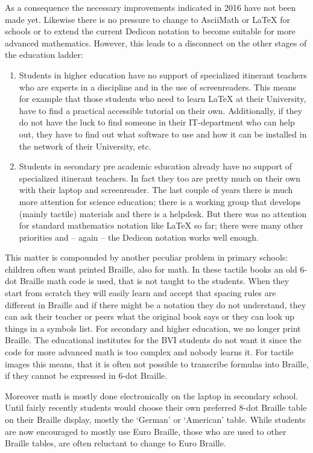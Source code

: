 \documentclass{easychair}
\begin{document}
As a consequence the necessary improvements indicated in 2016 have not been made
yet. Likewise there is no pressure to change to AsciiMath or {\LaTeX} for
schools or to extend the current Dedicon notation to become suitable for more
advanced mathematics.
However, this leads to a disconnect on the other stages of the education ladder:

\begin{enumerate}
\item Students in higher education have no support of specialized itinerant
  teachers who are experts in a discipline and in the use of screenreaders. This
  means for example that those students who need to learn {\LaTeX} at their
  University, have to find a practical accessible tutorial on their
  own. Additionally, if they do not have the luck to find someone in their
  IT-department who can help out, they have to find out what software to use and
  how it can be installed in the network of their University, etc.
\item Students in secondary pre academic education already have no support of
  specialized itinerant teachers. In fact they too are pretty much on their own
  with their laptop and screenreader. The last couple of years there is much
  more attention for science education; there is a working group that develops
  (mainly tactile) materials and there is a helpdesk. But there was no attention
  for standard mathematics notation like {\LaTeX} so far; there were many other
  priorities and – again – the Dedicon notation works well enough.
\end{enumerate}

This matter is compounded by another peculiar problem in primary schools:
children often want printed Braille, also for math. In these tactile books an
old 6-dot Braille math code is used, that is not taught to the students. When they
start from scratch they will easily learn and accept that spacing rules are
different in Braille and if there might be a notation they do not understand,
they can ask their teacher or peers what the original book says or they can look
up things in a symbols list. For secondary and higher education, we no longer
print Braille. The educational institutes for the BVI students do not want it
since the code for more advanced math is too complex and nobody learns it. For
tactile images this means, that it is often not possible to transcribe formulas
into Braille, if they cannot be expressed in 6-dot Braille.

Moreover math is mostly done electronically on the laptop in secondary
school. Until fairly recently students would choose their own preferred 8-dot
Braille table on their Braille display, mostly the ‘German’ or ‘American’
table. While students are now encouraged to mostly use Euro Braille, those who
are used to other Braille tables, are often reluctant to change to Euro
Braille.
\end{document}
